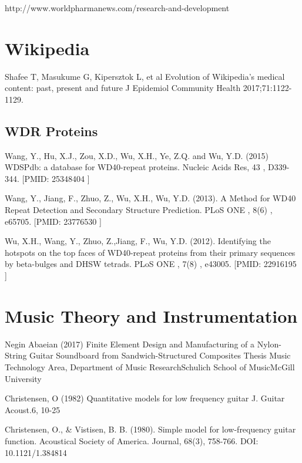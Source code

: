 \begin{thebibliography}{00}
 http://www.worldpharmanews.com/research-and-development
\section{Wikipedia}

 Shafee T, Masukume G, Kipersztok L, et al
\newblock Evolution of Wikipedia’s medical content: past, present and future
\newblock J Epidemiol Community Health 2017;71:1122-1129.

\subsection{WDR Proteins}

Wang, Y., Hu, X.J., Zou, X.D., Wu, X.H., Ye, Z.Q. and Wu, Y.D. (2015) 
\newblock WDSPdb: a database for WD40-repeat proteins. 
\newblock Nucleic Acids Res, 43 , D339-344. [PMID: 25348404 ]

Wang, Y., Jiang, F., Zhuo, Z., Wu, X.H., Wu, Y.D. (2013). 
\newblock A Method for WD40 Repeat Detection and Secondary Structure Prediction. 
\newblock PLoS ONE , 8(6) , e65705. [PMID: 23776530 ]

Wu, X.H., Wang, Y., Zhuo, Z.,Jiang, F., Wu, Y.D. (2012). 
\newblock Identifying the hotspots on the top faces of WD40-repeat proteins from their primary sequences by beta-bulges and DHSW tetrads. 
\newblock PLoS ONE , 7(8) , e43005. [PMID: 22916195 ] 

\section{Music Theory and Instrumentation}

 Negin Abaeian (2017)
\newblock Finite Element Design and Manufacturing of a Nylon-String Guitar Soundboard from Sandwich-Structured Composites
\newblock Thesis Music Technology Area, Department of Music ResearchSchulich School of MusicMcGill University

 Christensen, O (1982)
\newblock Quantitative models for low frequency guitar
\newblock J. Guitar Acoust.6, 10-25 

 Christensen, O., & Vistisen, B. B. (1980). 
\newblock Simple model for low-frequency guitar function. 
\newblock Acoustical Society of America. Journal, 68(3), 758-766. DOI: 10.1121/1.384814


\end{thebibliography}


